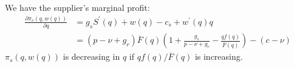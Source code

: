 We have the supplier's marginal profit:
\begin{align*}
    \frac{\partial\pi_s(q,w(q))}{\partial q}&=g_s S^\prime(q)+w(q)-c_s+w^\prime(q)q\\
    &=(p-\nu+g_r)\overline{F}(q)\left(1+\frac{g_s}{p-\nu+g_r}-\frac{q f(q)}{\overline{F}(q)}\right)-(c-\nu)
\end{align*}
$\pi_s(q,w(q))$ is decreasing in $q$ if $qf(q)/\overline{F}(q)$ is increasing.
